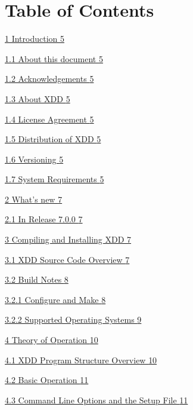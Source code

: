 \section{Table of Contents}\label{table-of-contents}

\hyperref[introduction]{1 Introduction \hyperref[introduction]{5}}

\hyperref[about-this-document]{1.1 About this document \hyperref[about-this-document]{5}}

\hyperref[acknowledgements]{1.2 Acknowledgements \hyperref[acknowledgements]{5}}

\hyperref[about-xdd]{1.3 About XDD \hyperref[about-xdd]{5}}

\hyperref[license-agreement]{1.4 License Agreement \hyperref[license-agreement]{5}}

\hyperref[distribution-of-xdd]{1.5 Distribution of XDD \hyperref[distribution-of-xdd]{5}}

\hyperref[versioning]{1.6 Versioning \hyperref[versioning]{5}}

\hyperref[system-requirements]{1.7 System Requirements \hyperref[system-requirements]{5}}

\hyperref[whats-new]{2 What's new \hyperref[whats-new]{7}}

\hyperref[in-release-7.0.0]{2.1 In Release 7.0.0 \hyperref[in-release-7.0.0]{7}}

\hyperref[compiling-and-installing-xdd]{3 Compiling and Installing XDD \hyperref[compiling-and-installing-xdd]{7}}

\hyperref[xdd-source-code-overview]{3.1 XDD Source Code Overview \hyperref[xdd-source-code-overview]{7}}

\hyperref[build-notes]{3.2 Build Notes \hyperref[build-notes]{8}}

\hyperref[configure-and-make]{3.2.1 Configure and Make \hyperref[configure-and-make]{8}}

\hyperref[supported-operating-systems]{3.2.2 Supported Operating Systems \hyperref[supported-operating-systems]{9}}

\hyperref[theory-of-operation]{4 Theory of Operation \hyperref[theory-of-operation]{10}}

\hyperref[xdd-program-structure-overview]{4.1 XDD Program Structure Overview \hyperref[xdd-program-structure-overview]{10}}

\hyperref[basic-operation]{4.2 Basic Operation \hyperref[basic-operation]{11}}

\hyperref[command-line-options-and-the-setup-file]{4.3 Command Line Options and the Setup File \hyperref[command-line-options-and-the-setup-file]{11}}


